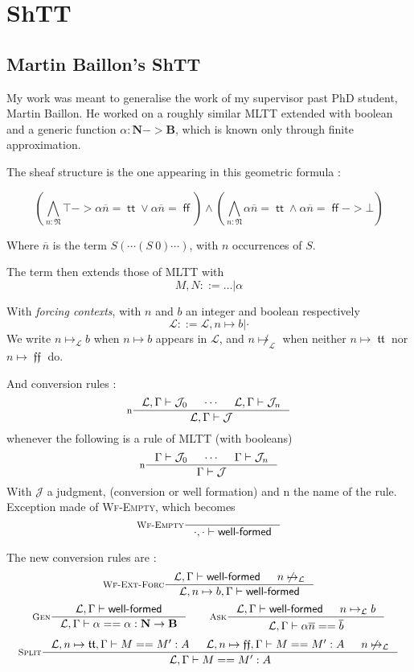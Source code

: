 \documentclass[11pt]{article}
\DeclareMathOperator{\true}{\mathsf{tt}}
\DeclareMathOperator{\false}{\mathsf{ff}}
\DeclareMathOperator{\mtrue}{\mathfrak{tt}}
\DeclareMathOperator{\mfalse}{\mathfrak{ff}}
\newcommand{\ovl}{\overline}
\newcommand{\0}{\mathbf{0}}
\newcommand{\1}{\mathbf{1}}
\newcommand{\nat}{\mathbf{N}}
\newcommand{\mnat}{\mathfrak{N}}
\newcommand{\bool}{\mathbf{B}}
\newcommand{\tctx}{\Gamma}
\newcommand{\Wf}{\textsf{well-formed}}
\newcommand{\fctx}{\mathcal{L}}
\begin{document}
\section{ShTT}\label{ShTT}
\subsection{Martin Baillon's ShTT}\label{MBshtt}
My work was meant to generalise the work of my supervisor past PhD student, Martin Baillon. He worked on a roughly similar MLTT extended with boolean and a generic function $\alpha: \nat -> \bool$, which is known only through finite approximation.

The sheaf structure is the one appearing in this geometric formula :

$$ \left(\bigwedge_{n : \mnat} \top -> \alpha \ovl{n} = \true \vee \alpha \ovl{n} = \false\right) \wedge \left(\bigwedge_{n : \mnat} \alpha \ovl{n} = \true \wedge \alpha \ovl{n} = \false -> \bot \right)$$

Where $\ovl{n}$ is the term $S (\cdots (S\ 0)\cdots)$, with $n$ occurrences of $S$.

The term then extends those of MLTT with
$$ M, N ::= \dots |\alpha$$

With \emph{forcing contexts}, with $n$ and $b$ an integer and boolean respectively
$$ \fctx ::= \fctx, n \mapsto b | \cdot$$
We write $n\mapsto_\fctx b$ when $n\mapsto b$ appears in $\fctx$, and $n\not\mapsto_\fctx$ when neither $n\mapsto \mtrue$ nor $n\mapsto \mfalse$ do.

And conversion rules :
$$
    \inference[n]{\fctx,\tctx |- \mathcal{J}_0 & \cdots & \fctx,\tctx |- \mathcal{J}_n}{\fctx,\tctx |- \mathcal{J}}
$$
whenever the following is a rule of MLTT (with booleans)
$$
    \inference[n]{\tctx |- \mathcal{J}_0 & \cdots & \tctx |- \mathcal{J}_n}{\tctx |- \mathcal{J}}
$$
With $\mathcal{J}$ a judgment, (conversion or well formation) and $\text{n}$ the name of the rule.
Exception made of \textsc{Wf-Empty}, which becomes
$$
    \inference[\textsc{Wf-Empty}]{}{\cdot,\cdot |- \Wf}
$$

The new conversion rules are :
$$
    \inference[\textsc{Wf-Ext-Forc}]{\fctx,\tctx |- \Wf & n\not\mapsto_\fctx}{\fctx, n\mapsto b, \tctx |- \Wf}
$$
$$
    \inference[\textsc{Gen}]{\fctx,\tctx|- \Wf}{\fctx,\tctx |- \alpha == \alpha : \nat -> \bool}
    \qquad
    \inference[\textsc{Ask}]{\fctx,\tctx|- \Wf &n\mapsto_\fctx b}{\fctx, \tctx |- \alpha \ovl n == \ovl b}
$$
$$
    \inference[\textsc{Split}]{\fctx,n\mapsto \mtrue,\tctx |-M == M' :A & \fctx, n\mapsto\mfalse, \tctx |- M == M' : A & n\not\mapsto_\fctx}{\fctx,\tctx |- M == M' : A}
$$
\end{document}
